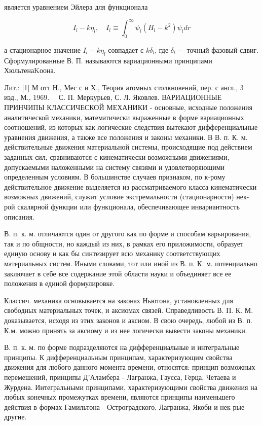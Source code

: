 \documentclass[10pt]{article}
\begin{document}
является уравнением Эйлера для функционала



\[

I_{l}-k \eta_{l}, \quad I_{l} \equiv \int_{0}^{\infty} \psi_{l}\left(H_{l}-k^{2}\right) \psi_{l} d r

\]



а стационарное значение $I_{l}-k \eta_{l}$ совпадает с $k \delta_{l}$, где $\delta_{l}-$ точный фазовый сдвиг. Сформулированные В. П. называются вариационными принципами ХюльтенаKоона.



Лит.: [1] М отт Н., Мес с и Х., Теория атомных столкновений, пер. с англ., 3 изд., М., $1969 . \quad$ С. П. Меркурьев, С. Л. Яковлев. ВАРИАЦИОННЫЕ ПРИНЧИПЫ КЛАССИЧЕСКОЙ МЕХАНИКИ - основные, исходные положения аналитической механики, математически выраженные в форме вариационных соотношений, из которых как логические следствия вытекают дифференциальные уравнения движения, а также все положения и законы механики. В В. п. К. м. действительные движения материальной системы, происходящие под действием заданных сил, сравниваются с кинематически возможными движениями, допускаемыми наложенными на систему связями и удовлетворяющими определенным условиям. В большинстве случаев признаком, по к-рому действительное движение выделяется из рассматриваемого класса кинематически возможных движений, служит условие экстремальности (стационарности) нек-рой скалярной функции или функционала, обеспечивающее инвариантность описания.



В. п. к. м. отличаются один от другого как по форме и способам варьирования, так и по общности, но каждый из них, в рамках его приложимости, образует единую основу и как бы синтезирует всю механику соответствующих материальных систем. Иными словами, тот или иной из В. п. К. м. потенциально заключает в себе все содержание этой области науки и объединяет все ее положения в единой формулировке.



Классич. механика основывается на законах Ньютона, установленных для свободных материальных точек, и аксиомах связей. Справедливость В. П. К. М. доказывается, исходя из этих законов и аксиом. В свою очередь, любой из В. п. К.м. можно принять за аксиому и из нее логически вывести законы механики.



В. п. к. м. по форме подразделяются на дифференциальные и интегральные принципы. К дифференциальным принципам, характеризующим свойства движения для любого данного момента времени, относятся: принцип возможных перемешений, принципы Д'Аламбера - Лагранжа, Гаусса, Герца, Четаева и Журдена. Интегральными принципами, характеризующими свойства движения на любых конечных промежутках времени, являются принципы наименьшего действия в формах Гамильтона - Остроградского, Лагранжа, Якоби и нек-рые другие.
\end{document}
